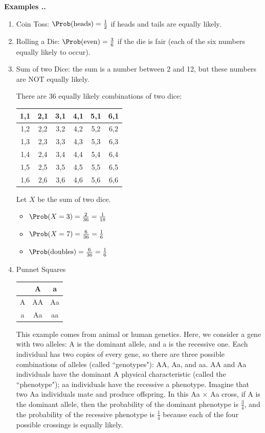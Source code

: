 \documentclass[twoside]{book}\usepackage[]{graphicx}\usepackage[]{xcolor}
\newcounter{example}[section]
\newenvironment{examples}%
{\refstepcounter{example}%
\textbf{Examples \thesection.\arabic{example}. }}%
{}
\begin{document}
\begin{examples}
\begin{enumerate}
\item Coin Toss: $\Prob(\mbox{heads}) = \frac{1}{2}$ if heads and tails are 
equally likely.
\item Rolling a Die: $\Prob(\mbox{even}) = \frac{3}{6}$ if the die is 
fair (each of the six numbers equally likely to occur).

\newpage

\item
Sum of two Dice: the sum is a number between 2 and 12, but these numbers
are NOT equally likely.  

There are 36 equally likely combinations of two dice:

\begin{center}
\large
\begin{tabular}{|*{6}{c|}}
\hline
1,1 & 2,1 & 3,1 & 4,1 & 5,1 & 6,1 
\\ \hline
1,2 & 2,2 & 3,2 & 4,2 & 5,2 & 6,2 
\\ \hline
1,3 & 2,3 & 3,3 & 4,3 & 5,3 & 6,3 
\\ \hline
1,4 & 2,4 & 3,4 & 4,4 & 5,4 & 6,4 
\\ \hline
1,5 & 2,5 & 3,5 & 4,5 & 5,5 & 6,5 
\\ \hline
1,6 & 2,6 & 3,6 & 4,6 & 5,6 & 6,6
\\ \hline
\end{tabular}
\end{center}

Let $X$ be the sum of two dice.
\begin{itemize}
\item $\Prob(X = 3) = \frac{2}{36} = \frac{1}{18}$
\item $\Prob(X = 7) = \frac{6}{36} = \frac{1}{6}$
\item $\Prob(\mbox{doubles}) = \frac{6}{36} = \frac{1}{6}$
\end{itemize}


\item
Punnet Squares

\begin{center}
\large
\begin{tabular}{c|cc}
& A & a \\ \hline
A & AA & Aa \\ 
a & Aa & aa \\ 
\end{tabular}
\end{center}
This example comes from animal or human genetics. Here, we consider a gene with two alleles:  A is the dominant allele, and a is the recessive one.  Each individual has two copies of every gene, so there are three possible combinations of alleles (called ``genotypes"): AA, Aa, and aa. AA and Aa individuals have the dominant A physical characteristic (called the ``phenotype"); aa individuals have the recessive a phenotype. Imagine that two Aa individuals mate and produce offspring. In this Aa $\times$ Aa cross,
if A is the dominant allele, then the probability of the dominant
phenotype is $\frac{3}{4}$, and the probability of the recessive 
phenotype is $\frac{1}{4}$ because each of the four possible crossings is equally likely.


\end{enumerate}
\end{examples}
\end{document}
